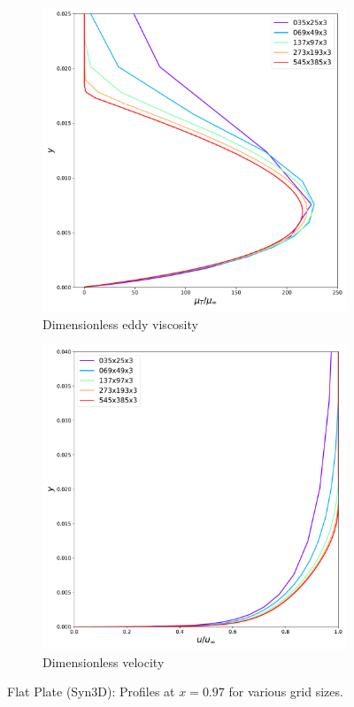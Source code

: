 \begin{figure}[ht!]
\centering
\begin{subfigure}{.45\textwidth}
  \centering
  \includegraphics[width=1.0\textwidth]{figs/flat/rev_grid.pdf}
  \caption{Dimensionless eddy viscosity}
\end{subfigure}%
\begin{subfigure}{.45\textwidth}
  \centering
  \includegraphics[width=1.0\textwidth]{figs/flat/u097_grid.pdf}
  \caption{Dimensionless velocity}
\end{subfigure}
\caption{Flat Plate (Syn3D): Profiles at $x=0.97$ for various grid sizes.}
\label{fig:synflatprofilestudy}
\end{figure}
